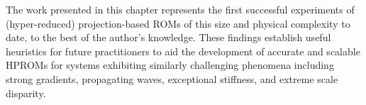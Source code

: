 The work presented in this chapter represents the first successful experiments of (hyper-reduced) projection-based ROMs of this size and physical complexity to date, to the best of the author's knowledge. These findings establish useful heuristics for future practitioners to aid the development of accurate and scalable HPROMs for systems exhibiting similarly challenging phenomena including strong gradients, propagating waves, exceptional stiffness, and extreme scale disparity.